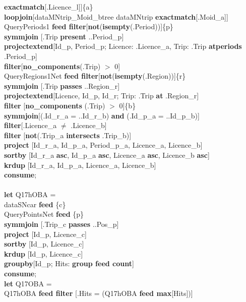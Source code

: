 \documentclass[a4paper]{article}
\newcommand{\op}[1]{\textbf{#1}}
\begin{document}
\begin{scriptsize}
\begin{tabbing}
\op{exactmatch}[.Licence\_l]]\{a\}\\
\>\>\>\op{loopjoin}[dataMNtrip\_Moid\_btree dataMNtrip
\op{exactmatch}[.Moid\_a]]\\
\>\>QueryPeriods1 \op{feed filter}[\op{not}(\op{isempty}(.Period))]\{p\}\\
\>\>\op{symmjoin} [.Trip \op{present} ..Period\_p]\\
\>\>\>\op{projectextend}[Id\_p, Period\_p; Licence: .Licence\_a, Trip: .Trip
\op{atperiods} .Period\_p]\\
\>\>\>\op{filter}[\op{no\_components}(.Trip) $>$ 0]\\
\>\>QueryRegions1Net \op{feed filter}[\op{not}(\op{isempty}(.Region))]\{r\}\\
\>\>\op{symmjoin} [.Trip \op{passes} ..Region\_r]\\
\>\>\>\op{projectextend}[Licence, Id\_p, Id\_r; Trip: .Trip \op{at}
.Region\_r]\\
\>\>\>\op{filter} [\op{no\_components} (.Trip) $>$ 0]\{b\}\\
\>\op{symmjoin}[(.Id\_r\_a = ..Id\_r\_b) \op{and} (.Id\_p\_a = ..Id\_p\_b)]\\
\>\op{filter}[.Licence\_a $\neq$ .Licence\_b]\\
\>\op{filter} [\op{not}(.Trip\_a \op{intersects} .Trip\_b)]\\
\>\op{project} [Id\_r\_a, Id\_p\_a, Period\_p\_a, Licence\_a, Licence\_b]\\
\>\op{sortby} [Id\_r\_a \op{asc}, Id\_p\_a \op{asc}, Licence\_a \op{asc},
Licence\_b \op{asc}]\\
\>\op{krdup} [Id\_r\_a, Id\_p\_a, Licence\_a, Licence\_b]\\
\op{consume};\\
\\
\op{let} Q17hOBA =\\
\>dataSNcar \op{feed} \{c\}\\
\>QueryPointsNet \op{feed} \{p\}\\
\>\op{symmjoin} [.Trip\_c \op{passes} ..Pos\_p]\\
\>\op{project} [Id\_p, Licence\_c]\\
\>\op{sortby} [Id\_p, Licence\_c]\\
\>\op{krdup} [Id\_p, Licence\_c]\\
\>\op{groupby}[Id\_p; Hits: \op{group feed count}]\\
\op{consume};\\
\op{let} Q17OBA =\\
\>Q17hOBA \op{feed filter} [.Hits = (Q17hOBA \op{feed max}[Hits])]\\

\end{tabbing}
\end{scriptsize}
\end{document}
